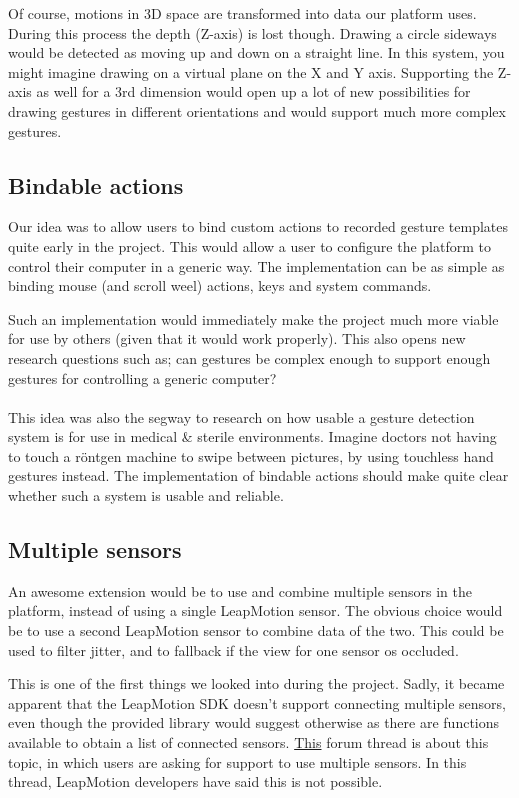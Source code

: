 \documentclass[a4paper]{article}
\begin{document}
  Of course, motions in 3D space are transformed into data our platform uses.
  During this process the depth (Z-axis) is lost though. Drawing a circle
  sideways would be detected as moving up and down on a straight line. In this
  system, you might imagine drawing on a virtual plane on the X and Y axis.
  Supporting the Z-axis as well for a 3rd dimension would open up a lot of new
  possibilities for drawing gestures in different orientations and would support
  much more complex gestures.

  \subsection*{Bindable actions}
  Our idea was to allow users to bind custom actions to recorded gesture
  templates quite early in the project. This would allow a user to configure the
  platform to control their computer in a generic way. The implementation can be
  as simple as binding mouse (and scroll weel) actions, keys and system commands.

  Such an implementation would immediately make the project much more viable for
  use by others (given that it would work properly). This also opens new
  research questions such as; can gestures be complex enough to support enough
  gestures for controlling a generic computer?

  \paragraph{}
  This idea was also the segway to research on how usable a gesture detection
  system is for use in medical \& sterile environments. Imagine doctors not
  having to touch a röntgen machine to swipe between pictures, by using
  touchless hand gestures instead. The implementation of bindable actions
  should make quite clear whether such a system is usable and reliable.

  \subsection*{Multiple sensors}
  An awesome extension would be to use and combine multiple sensors in the
  platform, instead of using a single LeapMotion sensor. The obvious choice
  would be to use a second LeapMotion sensor to combine data of the two. This
  could be used to filter jitter, and to fallback if the view for one sensor os
  occluded.

  This is one of the first things we looked into during the project. Sadly, it
  became apparent that the LeapMotion SDK doesn't support connecting multiple
  sensors, even though the provided library would suggest otherwise as there are
  functions available to obtain a list of connected sensors.
  \href{https://forums.leapmotion.com/t/multiple-leap-motion-support/770}{This}
  forum thread is about this topic, in which users are asking for support to use
  multiple sensors. In this thread, LeapMotion developers have said this is not
  possible.
\end{document}
